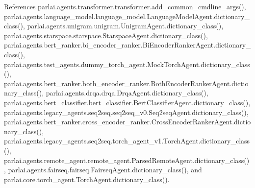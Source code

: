 References parlai.\+agents.\+transformer.\+transformer.\+add\+\_\+common\+\_\+cmdline\+\_\+args(), parlai.\+agents.\+language\+\_\+model.\+language\+\_\+model.\+Language\+Model\+Agent.\+dictionary\+\_\+class(), parlai.\+agents.\+unigram.\+unigram.\+Unigram\+Agent.\+dictionary\+\_\+class(), parlai.\+agents.\+starspace.\+starspace.\+Starspace\+Agent.\+dictionary\+\_\+class(), parlai.\+agents.\+bert\+\_\+ranker.\+bi\+\_\+encoder\+\_\+ranker.\+Bi\+Encoder\+Ranker\+Agent.\+dictionary\+\_\+class(), parlai.\+agents.\+test\+\_\+agents.\+dummy\+\_\+torch\+\_\+agent.\+Mock\+Torch\+Agent.\+dictionary\+\_\+class(), parlai.\+agents.\+bert\+\_\+ranker.\+both\+\_\+encoder\+\_\+ranker.\+Both\+Encoder\+Ranker\+Agent.\+dictionary\+\_\+class(), parlai.\+agents.\+drqa.\+drqa.\+Drqa\+Agent.\+dictionary\+\_\+class(), parlai.\+agents.\+bert\+\_\+classifier.\+bert\+\_\+classifier.\+Bert\+Classifier\+Agent.\+dictionary\+\_\+class(), parlai.\+agents.\+legacy\+\_\+agents.\+seq2seq.\+seq2seq\+\_\+v0.\+Seq2seq\+Agent.\+dictionary\+\_\+class(), parlai.\+agents.\+bert\+\_\+ranker.\+cross\+\_\+encoder\+\_\+ranker.\+Cross\+Encoder\+Ranker\+Agent.\+dictionary\+\_\+class(), parlai.\+agents.\+legacy\+\_\+agents.\+seq2seq.\+torch\+\_\+agent\+\_\+v1.\+Torch\+Agent.\+dictionary\+\_\+class(), parlai.\+agents.\+remote\+\_\+agent.\+remote\+\_\+agent.\+Parsed\+Remote\+Agent.\+dictionary\+\_\+class(), parlai.\+agents.\+fairseq.\+fairseq.\+Fairseq\+Agent.\+dictionary\+\_\+class(), and parlai.\+core.\+torch\+\_\+agent.\+Torch\+Agent.\+dictionary\+\_\+class().

